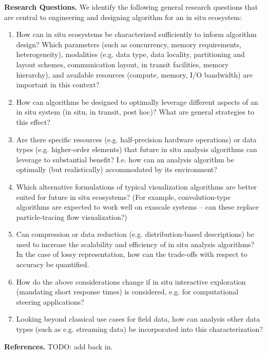 \medskip\noindent\textbf{\sffamily Research Questions.} 
We identify the following general research questions that are central to engineering and designing algorithm for an in situ ecosystem:
\begin{enumerate}
\item How can in situ ecosystems be characterized sufficiently to inform algorithm design? Which parameters (such as concurrency, memory requirements, heterogeneity), modalities (e.g. data type, data locality, partitioning and layout schemes, communication layout, in transit facilities, memory hierarchy), and available resources (compute, memory, I/O bandwidth) are important in this context?
\item How can algorithms be designed to optimally leverage different aspects of an in situ system (in situ, in transit, post hoc)? What are general strategies to this effect?
\item Are there specific resources (e.g. half-precision hardware operations) or data types (e.g. higher-order elements) that future in situ analysis algorithms can leverage to substantial benefit? I.e. how can an analysis algorithm be optimally (but realistically) accommodated by its environment?
\item Which alternative formulations of typical visualization algorithms are better suited for future in situ ecosystems? (For example, convolution-type algorithms are expected to work well on exascale systems – can these replace particle-tracing flow visualization?)
\item Can compression or data reduction (e.g. distribution-based descriptions) be used to increase the scalability and efficiency of in situ analysis algorithms? In the case of lossy representation, how can the trade-offs with respect to accuracy be quantified.
\item How do the above considerations change if in situ interactive exploration (mandating short response times)  is considered, e.g. for computational steering applications?
\item Looking beyond classical use cases for field data, how can analysis other data types (such as e.g. streaming data) be incorporated into this characterization?
\end{enumerate}

\medskip\noindent\textbf{\sffamily References.} TODO: add back in.


